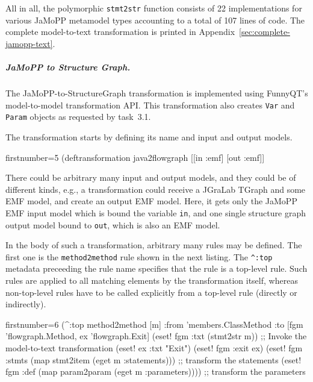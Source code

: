 \documentclass[submission]{eptcs}
\begin{document}
All in all, the polymorphic \verb|stmt2str| function consists of 22
implementations for various JaMoPP metamodel types accounting to a total of 107
lines of code.  The complete model-to-text transformation is printed in
Appendix~\ref{sec:complete-jamopp-text}.


\subparagraph{JaMoPP to Structure Graph.}
\label{sec:jamopp-struct-graph}

The JaMoPP-to-StructureGraph transformation is implemented using FunnyQT's
model-to-model transformation API.  This transformation also creates \verb|Var|
and \verb|Param| objects as requested by task~3.1.

The transformation starts by defining its name and input and output models.

\begin{clojurecode*}{firstnumber=5}
(deftransformation java2flowgraph [[in :emf] [out :emf]]
\end{clojurecode*}

There could be arbitrary many input and output models, and they could be of
different kinds, e.g., a transformation could receive a JGraLab TGraph and some
EMF model, and create an output EMF model.  Here, it gets only the JaMoPP EMF
input model which is bound the variable \verb|in|, and one single structure
graph output model bound to \verb|out|, which is also an EMF model.

In the body of such a transformation, arbitrary many rules may be defined.  The
first one is the \verb|method2method| rule shown in the next listing.  The
\verb|^:top| metadata preceeding the rule name specifies that the rule is a
top-level rule.  Such rules are applied to all matching elements by the
transformation itself, whereas non-top-level rules have to be called explicitly
from a top-level rule (directly or indirectly).

\begin{clojurecode*}{firstnumber=6}
  (^:top method2method [m]
         :from 'members.ClassMethod
         :to [fgm 'flowgraph.Method, ex 'flowgraph.Exit]
         (eset! fgm :txt (stmt2str m)) ;; Invoke the model-to-text transformation
         (eset! ex :txt "Exit")
         (eset! fgm :exit ex)
         (eset! fgm :stmts (map stmt2item (eget m :statements)))  ;; transform the statements
         (eset! fgm :def (map param2param (eget m :parameters)))) ;; transform the parameters
\end{clojurecode*}
\end{document}
